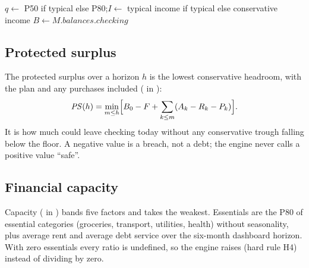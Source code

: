 \begin{algorithm}[htbp]
  \caption{Projection (\texttt{project}, \texttt{domain/finance/forecast.py}).}\label{alg:project}
  $q \gets$ P50 if typical else P80;\quad $I \gets$ typical income if typical else conservative income\;
  $B \gets M.\mathit{balances.checking}$\;
\end{algorithm}

\subsection{Protected surplus}\label{sec:surplus}

The protected surplus over a horizon $h$ is the lowest conservative headroom, with the plan and any purchases included
( in ):
\begin{equation}
  \mathit{PS}(h) = \min_{m \leq h} \Bigl[ B_0 - F + \sum_{k \leq m} (A_k - R_k - P_k) \Bigr].
\end{equation}
It is how much could leave checking today without any conservative trough falling below the floor. A negative value is
a breach, not a debt; the engine never calls a positive value ``safe''.

\subsection{Financial capacity}\label{sec:capacity}

Capacity ( in ) bands five factors and takes the weakest. Essentials are the
P80 of essential categories (groceries, transport, utilities, health) without seasonality, plus average rent and
average debt service over the six-month dashboard horizon. With zero essentials every ratio is undefined, so the engine
raises  (hard rule H4) instead of dividing by zero.

